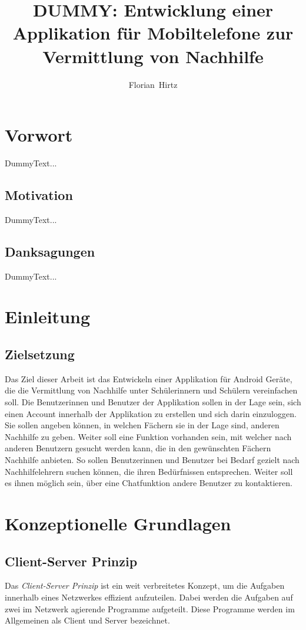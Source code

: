 \documentclass[a4paper,11pt]{report}
\author{Florian~Hirtz}
\title{DUMMY: Entwicklung einer Applikation für Mobiltelefone zur Vermittlung von Nachhilfe}
\begin{document}
	\maketitle
	\tableofcontents
	
	
	\chapter{Vorwort}
	DummyText...
		\section{Motivation}
		DummyText...
		\section{Danksagungen}
		DummyText...
	
	\chapter{Einleitung}
		\section{Zielsetzung}
		Das Ziel dieser Arbeit ist das Entwickeln einer Applikation für Android Geräte, die die Vermittlung von Nachhilfe unter Schülerinnern und Schülern vereinfachen soll. Die Benutzerinnen und Benutzer der Applikation sollen in der Lage sein, sich einen Account innerhalb der Applikation zu erstellen und sich darin einzuloggen. Sie sollen angeben können, in welchen Fächern sie in der Lage sind, anderen Nachhilfe zu geben. Weiter soll eine Funktion vorhanden sein, mit welcher nach anderen Benutzern gesucht werden kann, die in den gewünschten Fächern Nachhilfe anbieten. So sollen Benutzerinnen und Benutzer bei Bedarf gezielt nach Nachhilfelehrern suchen können, die ihren Bedürfnissen entsprechen. Weiter soll es ihnen möglich sein, über eine Chatfunktion andere Benutzer zu kontaktieren.
	
	\chapter{Konzeptionelle Grundlagen} \label{konzepte}
		\section{Client-Server Prinzip}
		Das \emph{Client-Server Prinzip} ist ein weit verbreitetes Konzept, um die Aufgaben innerhalb eines Netzwerkes effizient aufzuteilen. Dabei werden die Aufgaben auf zwei im Netzwerk agierende Programme aufgeteilt. Diese Programme werden im Allgemeinen als Client und Server bezeichnet.
	 
\end{document}
